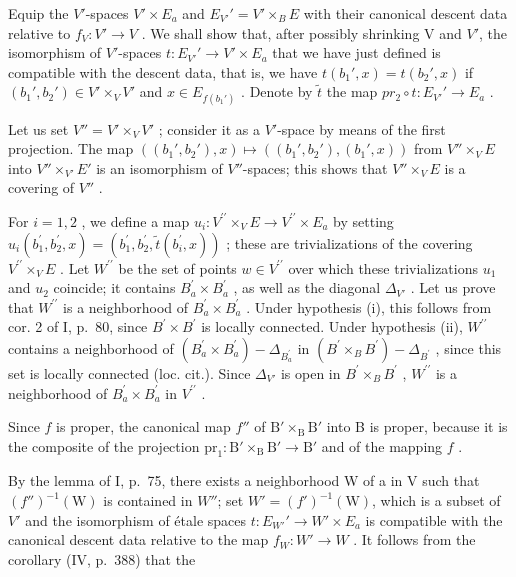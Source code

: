 Equip the \(V'\)-spaces \(V' \times E_{a}\) and \(E_{V'}' = V' \times_{B} E\) with their canonical descent data relative to \(f_{V}: V' \to V\) . We shall show that, after possibly shrinking V and \(V'\), the isomorphism of \(V'\)-spaces \(t: E_{V'}' \to V' \times E_{a}\) that we have just defined is compatible with the descent data, that is, we have \(t(b_{1}', x) = t(b_{2}', x)\) if \((b_{1}', b_{2}') \in V' \times_{V} V'\) and \(x \in E_{f(b_{1}')}\) . Denote by \(\widetilde{t}\) the map \(pr_{2} \circ t: E_{V'}' \to E_{a}\) .

Let us set \(V'' = V' \times_{V} V'\) ; consider it as a \(V'\)-space by means of the first projection. The map \(((b_{1}', b_{2}'), x) \mapsto ((b_{1}', b_{2}'), (b_{1}', x))\) from \(V'' \times_{V} E\) into \(V'' \times_{V'} E'\) is an isomorphism of \(V''\)-spaces; this shows that \(V'' \times_{V} E\) is a covering of \(V''\) .

For \(i=1,2\) , we define a map \(u_{i}\colon V^{\prime\prime}\times_{V}E\to V^{\prime\prime}\times E_{a}\) by setting \(u_{i}(b_{1}^{\prime},b_{2}^{\prime},x)=(b_{1}^{\prime},b_{2}^{\prime},\widetilde{t}(b_{i}^{\prime},x))\) ; these are trivializations of the covering \(V^{\prime\prime}\times_{V}E\) . Let \(W^{\prime\prime}\) be the set of points \(w\in V^{\prime\prime}\) over which these trivializations \(u_{1}\) and \(u_{2}\) coincide; it contains \(B_{a}^{\prime}\times B_{a}^{\prime}\) , as well as the diagonal \(\Delta_{V'}\) . Let us prove that \(W^{\prime\prime}\) is a neighborhood of \(B_{a}^{\prime}\times B_{a}^{\prime}\) . Under hypothesis (i), this follows from cor. 2 of I, p.~80, since \(B^{\prime}\times B^{\prime}\) is locally connected. Under hypothesis (ii), \(W^{\prime\prime}\) contains a neighborhood of \((B_{a}^{\prime}\times B_{a}^{\prime})-\Delta_{B_{a}^{\prime}}\) in \((B^{\prime}\times_{B}B^{\prime})-\Delta_{B^{\prime}}\) , since this set is locally connected (loc. cit.). Since \(\Delta_{V'}\) is open in \(B^{\prime}\times_{B}B^{\prime}\) , \(W^{\prime\prime}\) is a neighborhood of \(B_{a}^{\prime}\times B_{a}^{\prime}\) in \(V^{\prime\prime}\) .

Since \(f\) is proper, the canonical map \(f''\) of \(\mathrm{B}' \times_{\mathrm{B}} \mathrm{B}'\) into B is proper, because it is the composite of the projection \(\mathrm{pr}_{1} \colon \mathrm{B}' \times_{\mathrm{B}} \mathrm{B}' \to \mathrm{B}'\) and of the mapping \(f\) .

By the lemma of I, p.~75, there exists a neighborhood W of a in V such that \((f'')^{-1}(\mathrm{W})\) is contained in \(W''\); set \(W'=(f')^{-1}(\mathrm{W})\), which is a subset of \(V'\) and the isomorphism of étale spaces \(t: E_{W'}' \to W' \times E_a\) is compatible with the canonical descent data relative to the map \(f_W: W' \to W\) . It follows from the corollary (IV, p.~388) that the

